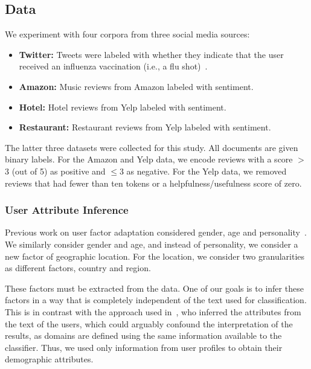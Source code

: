 \subsection{Data}
\label{chap4:subsec:data1}

We experiment with four corpora from three social media sources:
\begin{itemize}
\setlength\itemsep{0ex}
    \item {\bf Twitter:} Tweets were labeled with whether they indicate that the user received an influenza vaccination (i.e., a flu shot)~\cite{huang2017examining}.
    \item {\bf Amazon:} Music reviews from Amazon labeled with sentiment.
    \item {\bf Hotel:} Hotel reviews from Yelp labeled with sentiment.
    \item {\bf Restaurant:} Restaurant reviews from Yelp labeled with sentiment.
\end{itemize}

The latter three datasets were collected for this study.
All documents are given binary labels.
For the Amazon and Yelp data, we encode reviews with a score $>$$3$ (out of 5) as positive and $\leq$$3$ as negative.
For the Yelp data, we removed reviews that had fewer than ten tokens or a helpfulness/usefulness score of zero. 


\subsubsection{User Attribute Inference}

Previous work on user factor adaptation considered gender, age and personality~\cite{lynn2017human}.
We similarly consider gender and age, and instead of personality, we consider a new factor of geographic location.
For the location, we consider two granularities as different factors, country and region.

These factors must be extracted from the data.
One of our goals is to infer these factors
in a way that is completely independent of the text used for classification.
This is in contrast with the approach used in~\cite{lynn2017human, wood2020using},
who inferred the attributes from the text of the users,
which could arguably confound the interpretation of the results,
as domains are defined using the same information available to the classifier.
Thus, we used only information from user profiles to obtain their demographic attributes.


